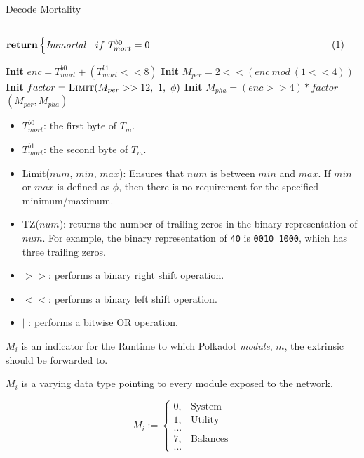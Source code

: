 \begin{definition}
    \begin{algorithm}[H]
        \caption[]{\sc Decode Mortality}
        \label{algo-decode-mortality}
        \begin{algorithmic}[1]
            \State $\vcenter{
                \begin{flalign*}
                    \Return & 
                    \begin{cases}
                    \textit{Immortal} & if\ T^{b0}_{mort} = 0
                    \end{cases}&
                \end{flalign*}
            }$
            \Statex 
            \State \textbf{Init} $enc = T^{b0}_{mort} + (T^{b1}_{mort} << 8)$
            \State \textbf{Init} $M_{per} = 2 << (enc\ mod\ (1 << 4))$
            \State \textbf{Init} $factor = \textsc{Limit}(M_{per} >> 12,\ 1,\ \phi)$
            \State \textbf{Init} $M_{pha} = (enc >> 4) * factor$
            \State \Return $(M_{per}, M_{pha})$
        \end{algorithmic}
    \end{algorithm}

    \begin{itemize}
        \item $T^{b0}_{mort}$: the first byte of $T_m$.
        \item $T^{b1}_{mort}$: the second byte of $T_m$.
        \item {\sc Limit($num$, $min$, $max$)}: Ensures that $num$ is between
        $min$ and $max$. If $min$ or $max$ is defined as $\phi$, then there is
        no requirement for the specified minimum/maximum.
        \item {\sc TZ($num$)}: returns the number of trailing zeros in the
        binary representation of $num$. For example, the binary
        representation of \verb|40| is \verb|0010 1000|, which has three
        trailing zeros.
        \item $>>$: performs a binary right shift operation.
        \item $<<$: performs a binary left shift operation.
        \item $|$ : performs a bitwise OR operation.
    \end{itemize}
\end{definition}

\begin{definition}
    \label{defn-module-indicator}
    $M_i$ is an indicator for the Runtime to which Polkadot \textit{module},
    $m$, the extrinsic should be forwarded to.
    \newline

    $M_i$ is a varying data type pointing to every module exposed to the
    network.

    \[
    M_i :=
    \begin{cases}
    0, & \text{System} \\
    1, & \text{Utility} \\
    ... & \\
    7, & \text{Balances} \\
    ... &
    \end{cases}
    \]
\end{definition}

